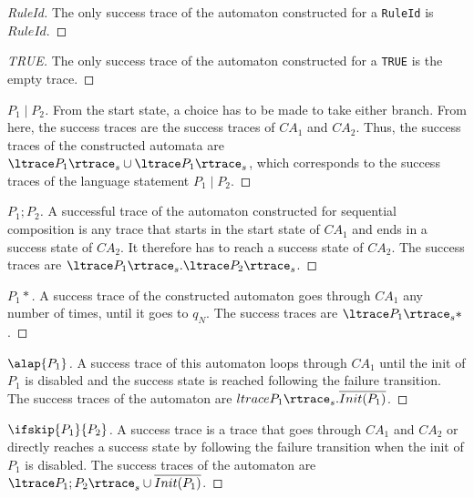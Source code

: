 \begin{proof}[RuleId]
The only success trace of the automaton constructed for a {\tt RuleId} is $RuleId$.
\end{proof}

\begin{proof}[TRUE]
The only success trace of the automaton constructed for a {\tt TRUE} is the empty trace.
\end{proof}

\begin{proof}[$P_1 \mid P_2$]
From the start state, a choice has to be made to take either branch. From here, the success traces are the success traces of $CA_1$ and $CA_2$. Thus, the success traces of the constructed automata are ${\ltrace P_1 \rtrace}_s \cup {\ltrace P_1 \rtrace}_s$, which corresponds to the success traces of the language statement $P_1 \mid P_2$.
\end{proof}

\begin{proof}[$P_1;P_2$]
A successful trace of the automaton constructed for sequential composition is any trace that starts in the start state of $CA_1$ and ends in a success state of $CA_2$. It therefore has to reach a success state of $CA_2$. The success traces are ${\ltrace P_1 \rtrace}_s . {\ltrace P_2 \rtrace}_s$.
\end{proof}

\begin{proof}[$P_1*$]
A success trace of the constructed automaton goes through $CA_1$ any number of times, until it goes to $q_N$. The success traces are ${\ltrace P_1 \rtrace}_s*$.
\end{proof}

\begin{proof}[$\alap{P_1}$]
A success trace of this automaton loops through $CA_1$ until the init of $P_1$ is disabled and the success state is reached following the failure transition. The success traces of the automaton are $ {ltrace P_1 \rtrace}_s . \overline{Init(P_1)}$. 
\end{proof}

\begin{proof}[$\ifskip{P_1}{P_2}$]
A success trace is a trace that goes through $CA_1$ and $CA_2$ or directly reaches a success state by following the failure transition when the init of $P_1$ is disabled. The success traces of the automaton are ${ \ltrace P_1;P_2 \rtrace}_s \cup \overline{Init(P_1)}$.
\end{proof}

